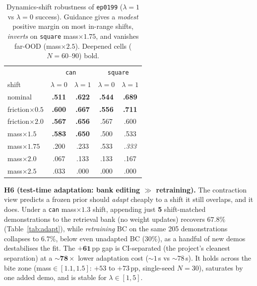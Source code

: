 \documentclass[letterpaper, 10 pt, conference]{ieeeconf}
\begin{document}
\begin{table}[h]
\centering\scriptsize
\setlength{\tabcolsep}{3.5pt}
\renewcommand{\arraystretch}{0.95}
\caption{Dynamics-shift robustness of \texttt{ep0199} ($\lambda\!=\!1$ vs
$\lambda\!=\!0$ success). Guidance gives a \emph{modest} positive margin on most
in-range shifts, \emph{inverts} on \texttt{square} mass$\times1.75$, and
vanishes far-OOD (mass$\times2.5$). Deepened cells ($N\!=\!60$--$90$) bold.}
\label{tab:robust}
\begin{tabular}{@{}lcccc@{}}
\hline
 & \multicolumn{2}{c}{\texttt{can}} & \multicolumn{2}{c}{\texttt{square}} \\
shift & $\lambda\!=\!0$ & $\lambda\!=\!1$ & $\lambda\!=\!0$ & $\lambda\!=\!1$ \\
\hline
nominal             & \textbf{.511} & \textbf{.622} & \textbf{.544} & \textbf{.689} \\
friction$\times0.5$ & \textbf{.600} & \textbf{.667} & \textbf{.556} & \textbf{.711} \\
friction$\times2.0$ & \textbf{.567} & \textbf{.656} & .567 & .600 \\
mass$\times1.5$     & \textbf{.583} & \textbf{.650} & .500 & .533 \\
mass$\times1.75$    & .200 & .233 & .533 & \emph{.333} \\
mass$\times2.0$     & .067 & .133 & .133 & .167 \\
mass$\times2.5$     & .033 & .000 & .000 & .000 \\
\hline
\end{tabular}
\end{table}

\textbf{H6 (test-time adaptation: bank editing $\gg$ retraining).} The
contraction view predicts a frozen prior should \emph{adapt} cheaply to a
shift it still overlaps, and it does. Under a \texttt{can} mass$\times1.3$ shift,
appending just \textbf{5} shift-matched demonstrations to the retrieval
bank (no weight updates) recovers $\mathbf{67.8\%}$
(Table~\ref{tab:adapt}), while \emph{retraining} BC on the same 205
demonstrations collapses to $6.7\%$, below even unadapted BC ($30\%$), as
a handful of new demos destabilises the fit. The $\mathbf{+61}$\,pp gap is
CI-separated (the project's cleanest separation) at a
$\mathbf{\sim\!78\times}$ lower adaptation cost ($\sim\!1$\,s vs
$\sim\!78$\,s). It holds across the bite zone (mass$\in[1.1,1.5]$: $+53$ to
$+73$\,pp, single-seed $N\!=\!30$), saturates by one added demo, and is
stable for $\lambda\!\in\![1,5]$.
\end{document}
